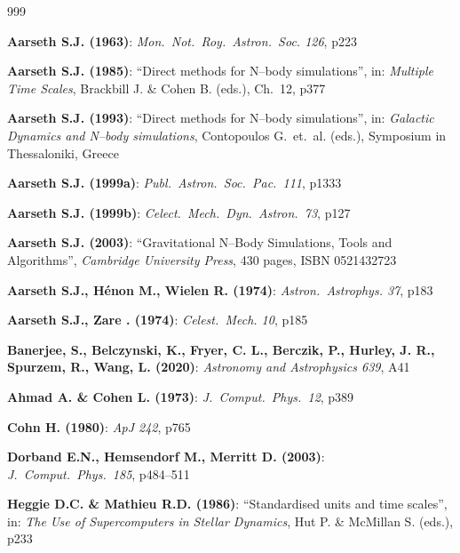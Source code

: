 
\begin{thebibliography}{999}

\renewcommand{\bibname}{References}
\addcontentsline{toc}{section}{\bibname}

\pagestyle{fancy}
\cfoot{}



\textbf{Aarseth S.J. (1963)}:
    \textit{Mon.\ Not.\ Roy.\ Astron.\ Soc. 126}, p223

\textbf{Aarseth S.J. (1985)}:
    ``Direct methods for N--body simulations'',
    in: \textit{Multiple Time Scales},
    Brackbill J. \& Cohen B. (eds.), Ch.\ 12, p377

\textbf{Aarseth S.J. (1993)}:
    ``Direct methods for N--body simulations'',
    in: \textit{Galactic Dynamics and N--body simulations},
    Contopoulos G.\ et.~al. (eds.),
    Symposium in Thessaloniki, Greece

\textbf{Aarseth S.J. (1999a)}:
    \textit{Publ.\ Astron.\ Soc.\ Pac.\ 111}, p1333

\textbf{Aarseth S.J. (1999b)}:
    \textit{Celect.\ Mech.\ Dyn.\ Astron.\ 73}, p127

\textbf{Aarseth S.J. (2003)}:
    ``Gravitational N--Body Simulations, Tools and Algorithms'',
    \textit{Cambridge University Press}, 430 pages,
    ISBN 0521432723

\textbf{Aarseth S.J., H\'enon M., Wielen R. (1974)}:
    \textit{Astron.\ Astrophys. 37}, p183

\textbf{Aarseth S.J., Zare . (1974)}:
    \textit{Celest.\ Mech. 10}, p185

\textbf{Banerjee, S., Belczynski, K., Fryer, C. L., Berczik, P., Hurley, J. R., Spurzem, R., Wang, L. (2020)}:     \textit{Astronomy and Astrophysics 639}, A41


\textbf{Ahmad A. \& Cohen L. (1973)}: 
    \textit{J.\ Comput.\ Phys.\ 12}, p389


\textbf{Cohn H. (1980)}:
    \textit{ApJ 242}, p765


\textbf{Dorband E.N., Hemsendorf M., Merritt D. (2003)}:
    \textit{J.\ Comput.\ Phys.\ 185}, p484--511


\textbf{Heggie D.C. \& Mathieu R.D. (1986)}:
    ``Standardised units and time scales'',
    in: \textit{The Use of Supercomputers in Stellar Dynamics},
    Hut P. \& McMillan S. (eds.), p233



\end{thebibliography}
